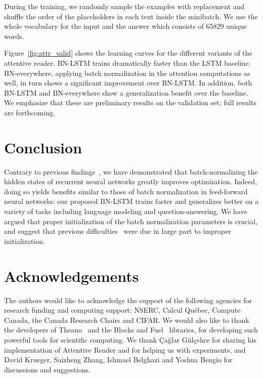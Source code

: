 \documentclass{article} %
\begin{document}
During the training, we randomly sample the examples with replacement and shuffle the order of the placeholders in each text inside the minibatch. We use the whole vocabulary for the input and the answer which consists of 65829 unique words.

Figure~\ref{fig:attr_valid} shows the learning curves for the different variants of the attentive reader.
BN-LSTM trains dramatically faster than the LSTM baseline.
BN-everywhere, applying batch normalization in the attention computations as well, in turn shows a significant
improvement over BN-LSTM.
In addition, both BN-LSTM and BN-everywhere show a generalization benefit over the baseline.
We emphasize that these are preliminary results on the validation set; full results are forthcoming.

\section{Conclusion}

Contrary to previous findings~\cite{cesar,baidu},
we have demonstrated that batch-normalizing the hidden states of recurrent neural networks greatly improves optimization.
Indeed, doing so yields benefits similar to those of batch normalization in feed-forward neural networks:
our proposed BN-LSTM trains faster and generalizes better on a variety of tasks including language modeling and question-answering.
We have argued that proper initialization of the batch normalization parameters is crucial,
and suggest that previous difficulties~\cite{cesar, baidu} were due in large part to improper initialization.

\section*{Acknowledgements}

The authors would like to acknowledge the support of the following agencies for
research funding and computing support: NSERC, Calcul Qu\'{e}bec, Compute Canada,
the Canada Research Chairs and CIFAR.
We would also like to thank the developers of Theano~\cite{theano2} and the
Blocks and Fuel~\cite{blocks} libraries,
for developing such powerful tools for scientific computing.
We thank Çağlar Gülçehre for sharing his implementation of Attentive Reader and for helping us with experiments,
and David Krueger, Saizheng Zhang, Ishmael Belghazi and Yoshua Bengio for discussions and suggestions.



\end{document}
